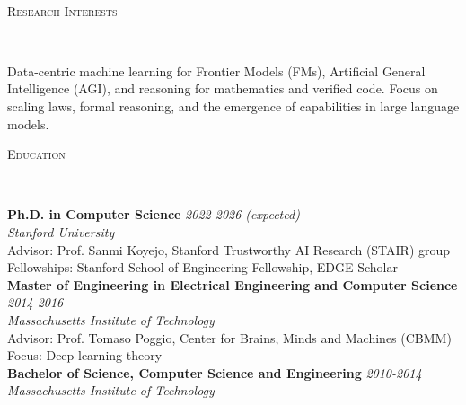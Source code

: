 \documentclass{article}
\newenvironment{changemargin}[2]{%
  \begin{list}{}{%
    \setlength{\topsep}{0pt}%
    \setlength{\leftmargin}{#1}%
    \setlength{\rightmargin}{#2}%
    \setlength{\listparindent}{\parindent}%
    \setlength{\itemindent}{\parindent}%
    \setlength{\parsep}{\parskip}%
  }%
  \item[]}{\end{list}
}
\newcommand{\lineover}{
	\begin{changemargin}{-0.05in}{-0.05in}
		\vspace*{-8pt}
		\hrulefill \\
		\vspace*{-2pt}
	\end{changemargin}
}
\newcommand{\header}[1]{
	\begin{changemargin}{-0.5in}{-0.5in}
		\scshape{#1}\\
  	\lineover
	\end{changemargin}
}
\newenvironment{body} {
	\vspace*{-16pt}
	\begin{changemargin}{-0.25in}{-0.5in}
  }	
	{\end{changemargin}
}
\begin{document}

\begin{changemargin}{-0.5in}{-0.5in}
\\ 
\vspace{10 pt}
\end{changemargin}


\header{Research Interests}

\begin{body}
	\vspace{14pt}
	Data-centric machine learning for Frontier Models (FMs), Artificial General Intelligence (AGI), and reasoning for mathematics and verified code. Focus on scaling laws, formal reasoning, and the emergence of capabilities in large language models.
\end{body}

\smallskip

\header{Education}

\begin{body}
	\vspace{14pt}
	\textbf{Ph.D. in Computer Science} \hfill \emph{2022-2026 (expected)}\\
	\emph{Stanford University} \hfill {}\\
	Advisor: Prof. Sanmi Koyejo, Stanford Trustworthy AI Research (STAIR) group\\
    Fellowships: Stanford School of Engineering Fellowship, EDGE Scholar\\

	\textbf{Master of Engineering in Electrical Engineering and Computer Science} \hfill \emph{2014-2016}\\
	\emph{Massachusetts Institute of Technology} \hfill {}\\
    Advisor: Prof. Tomaso Poggio, Center for Brains, Minds and Machines (CBMM)\\
    Focus: Deep learning theory\\

	\textbf{Bachelor of Science, Computer Science and Engineering} \hfill \emph{2010-2014} \\
	\emph{Massachusetts Institute of Technology} \hfill {}\\
\end{body}
\end{document}
